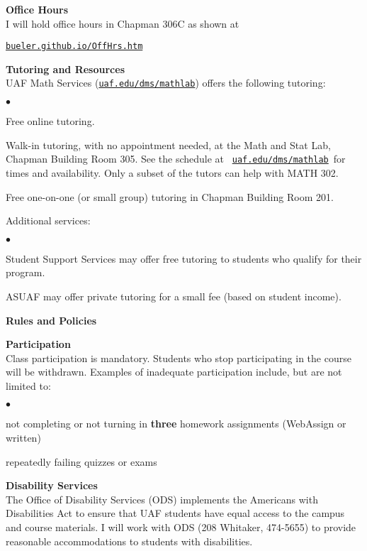 \documentclass[12pt]{article}
\renewcommand{\emph}[1]{\textsf{\textbf{#1}}}
\newcommand{\localhead}[1]{\par\smallskip\textbf{#1}\nobreak\\}%
\def\heading#1{\localhead{\large\emph{#1}}}
\def\subheading#1{\localhead{\emph{#1}}}
\newenvironment{clist}%
{\bgroup\parskip 0pt\begin{list}{$\bullet$}{\partopsep 4pt\topsep 0pt\itemsep -2pt}}%
{\end{list}\egroup}%
\begin{document}
\vspace{-0.3in}

\heading{Office Hours}
I will hold office hours in Chapman 306C as shown at

\smallskip
\centerline{\href{http://bueler.github.io/OffHrs.htm}{\tt bueler.github.io/OffHrs.htm}}


\heading{Tutoring and Resources}
UAF Math Services (\href{http://www.uaf.edu/dms/mathlab/}{\texttt{uaf.edu/dms/mathlab}}) offers the following tutoring:
\begin{clist}
	\item Free online tutoring.
	\item Walk-in tutoring, with no appointment needed, at the Math and Stat Lab, Chapman Building Room 305.  See the schedule at \, \href{http://www.uaf.edu/dms/mathlab/}{\texttt{uaf.edu/dms/mathlab}}\, for times and availability.  Only a subset of the tutors can help with MATH 302.
	\item Free one-on-one (or small group) tutoring in Chapman Building Room 201.
\end{clist}

Additional services:
\begin{clist}
	\item Student Support Services may offer free tutoring to students who qualify for their program.
	\item ASUAF may offer private tutoring for a small fee (based on student income).
\end{clist}


\newpage
\strut

\heading{Rules and Policies}
\vskip -20pt
\subheading{Participation}
Class participation is mandatory.  Students who stop participating in the course will be withdrawn.  Examples of inadequate participation include, but are not limited to:

\begin{clist}
\item not completing or not turning in \textbf{three} homework assignments (WebAssign or written)
\item repeatedly failing quizzes or exams
\end{clist}

\subheading{Disability Services}
The Office of Disability Services (ODS) implements the Americans with Disabilities Act to ensure that UAF students have equal access to the campus and course materials.  I will work with ODS (208 Whitaker, 474-5655) to provide reasonable accommodations to students with disabilities.
\end{document}

